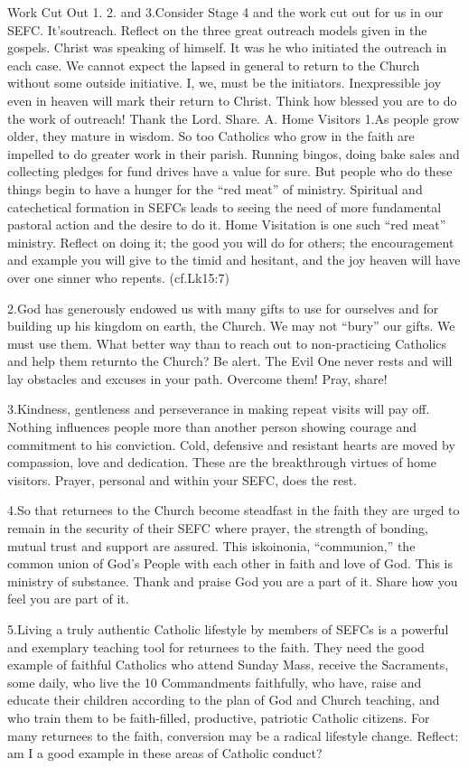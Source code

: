 \documentclass[oneside]{book}
\begin{document}
Work Cut Out
1. 2. and 3.Consider Stage 4 and the work cut out for us in our
SEFC. It'soutreach. Reflect on the three great outreach models given in the
gospels. Christ was speaking of himself. It was he who initiated the outreach in
each case. We cannot expect the lapsed in general to return to the Church
without some outside initiative. I, we, must be the initiators. Inexpressible
joy even in heaven will mark their return to Christ. Think how blessed you are
to do the work of outreach! Thank the Lord. Share.
A. Home Visitors
1.As people grow older, they mature in wisdom. So too Catholics who grow in the
faith are impelled to do greater work in their parish. Running bingos, doing
bake sales and collecting pledges for fund drives have a value for sure. But
people who do these things begin to have a hunger for the ``red meat'' of
ministry. Spiritual and catechetical formation in SEFCs leads to seeing the need
of more fundamental pastoral action and the desire to do it. Home Visitation is
one such ``red meat'' ministry. Reflect on doing it; the good you will do for
others; the encouragement and example you will give to the timid and hesitant,
and the joy heaven will have over one sinner who repents. (cf.Lk15:7)

2.God has generously endowed us with many gifts to use for ourselves and for
building up his kingdom on earth, the Church. We may not ``bury'' our gifts. We
must use them. What better way than to reach out to non-practicing Catholics and
help them returnto the Church? Be alert. The Evil One never rests and will lay
obstacles and excuses in your path. Overcome them! Pray, share!

3.Kindness, gentleness and perseverance in making repeat visits will pay
off. Nothing influences people more than another person showing courage and
commitment to his conviction. Cold, defensive and resistant hearts are moved by
compassion, love and dedication. These are the breakthrough virtues of home
visitors. Prayer, personal and within your SEFC, does the rest.

4.So that returnees to the Church become steadfast in the faith they are urged
to remain in the security of their SEFC where prayer, the strength of bonding,
mutual trust and support are assured. This iskoinonia, ``communion,'' the common
union of God's People with each other in faith and love of God. This is ministry
of substance. Thank and praise God you are a part of it. Share how you feel you
are part of it.

5.Living a truly authentic Catholic lifestyle by members of SEFCs is a powerful
and exemplary teaching tool for returnees to the faith. They need the good
example of faithful Catholics who attend Sunday Mass, receive the Sacraments,
some daily, who live the 10 Commandments faithfully, who have, raise and educate
their children according to the plan of God and Church teaching, and who train
them to be faith-filled, productive, patriotic Catholic citizens. For many
returnees to the faith, conversion may be a radical lifestyle change. Reflect:
am I a good example in these areas of Catholic conduct?
\end{document}
